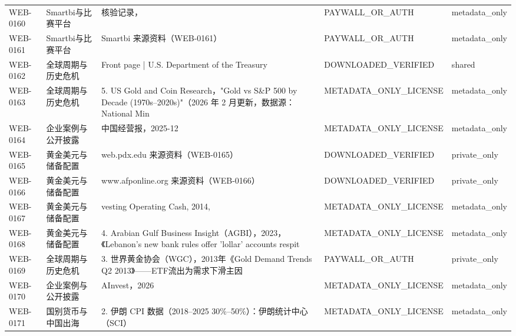 \documentclass[UTF8,openany,oneside,11pt]{ctexbook}
\begin{document}
\begin{longtable}{L{1.4cm}L{2.4cm}L{6.0cm}L{3.0cm}L{1.8cm}}
WEB-\allowbreak{}0160 & Smartbi与比赛平台 & 核验记录， & PAYWALL\_\allowbreak{}OR\_\allowbreak{}AUTH & metadata\_\allowbreak{}only \\
WEB-\allowbreak{}0161 & Smartbi与比赛平台 & Smartbi 来源资料（WEB-\allowbreak{}0161） & PAYWALL\_\allowbreak{}OR\_\allowbreak{}AUTH & metadata\_\allowbreak{}only \\
WEB-\allowbreak{}0162 & 全球周期与历史危机 & Front page | U.S. Department of the Treasury & DOWNLOADED\_\allowbreak{}VERIFIED & shared \\
WEB-\allowbreak{}0163 & 全球周期与历史危机 & 5. US Gold and Coin Research，"Gold vs S\&P 500 by Decade (1970s–2020s)"（2026 年 2 月更新，数据源：National Min & METADATA\_\allowbreak{}ONLY\_\allowbreak{}LICENSE & metadata\_\allowbreak{}only \\
WEB-\allowbreak{}0164 & 企业案例与公开披露 & 中国经营报，2025-\allowbreak{}12 & METADATA\_\allowbreak{}ONLY\_\allowbreak{}LICENSE & metadata\_\allowbreak{}only \\
WEB-\allowbreak{}0165 & 黄金美元与储备配置 & web.pdx.edu 来源资料（WEB-\allowbreak{}0165） & DOWNLOADED\_\allowbreak{}VERIFIED & private\_\allowbreak{}only \\
WEB-\allowbreak{}0166 & 黄金美元与储备配置 & www.afponline.org 来源资料（WEB-\allowbreak{}0166） & DOWNLOADED\_\allowbreak{}VERIFIED & private\_\allowbreak{}only \\
WEB-\allowbreak{}0167 & 黄金美元与储备配置 & vesting Operating Cash,\allowbreak{} 2014,\allowbreak{} & METADATA\_\allowbreak{}ONLY\_\allowbreak{}LICENSE & metadata\_\allowbreak{}only \\
WEB-\allowbreak{}0168 & 黄金美元与储备配置 & 4. Arabian Gulf Business Insight（AGBI），2023，《Lebanon's new bank rules offer 'lollar' accounts respit & METADATA\_\allowbreak{}ONLY\_\allowbreak{}LICENSE & metadata\_\allowbreak{}only \\
WEB-\allowbreak{}0169 & 全球周期与历史危机 & 3. 世界黄金协会（WGC），2013年《Gold Demand Trends Q2 2013》——ETF流出为需求下滑主因 & PAYWALL\_\allowbreak{}OR\_\allowbreak{}AUTH & private\_\allowbreak{}only \\
WEB-\allowbreak{}0170 & 企业案例与公开披露 & AInvest，2026 & METADATA\_\allowbreak{}ONLY\_\allowbreak{}LICENSE & metadata\_\allowbreak{}only \\
WEB-\allowbreak{}0171 & 国别货币与中国出海 & 2. 伊朗 CPI 数据（2018–2025 30\%–50\%）：伊朗统计中心（SCI） & METADATA\_\allowbreak{}ONLY\_\allowbreak{}LICENSE & metadata\_\allowbreak{}only \\

\end{longtable}
\end{document}
